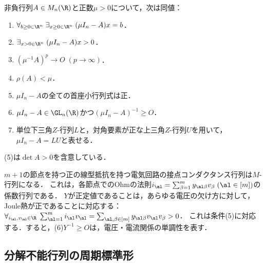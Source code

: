 \documentclass[uplatex, dvipdfmx]{jsreport}
\begin{document}
\begin{theorem}
    非負行列$A\in M_n(\R)$と正数$\mu>0$について，次は同値：
    \begin{enumerate}
        \item $\forall_{b\ge0\in\R^n}\;\exists_{x\ge0\in\R^n}\;(\mu I_n-A)x=b$．
        \item $\exists_{x>0\in\R^n}\;(\mu I_n-A)x>0$．
        \item $(\mu^{-1}A)^p\to O\;(p\to\infty)$．
        \item $\rho(A)<\mu$．
        \item $\mu I_n-A$の全ての首座小行列式は正．
        \item $\mu I_n-A\in\GL_n(\R)$かつ$(\mu I_n-A)^{-1}\ge O$．
        \item 単位下三角$Z$-行列$L$と，対角要素が正な上三角$Z$-行列$U$を用いて，$\mu I_n-A=LU$と表せる．
    \end{enumerate}
    (5)は$\det A>0$を含意している．
\end{theorem}
\begin{remarks}
    $m+1$の節点を持つ正の線型抵抗を持つ電気回路の接点コンダクタンス行列は$M$-行列になる．
    これは，各節点でのOhmの法則$i_\al=\sum_{\beta=1}^my_{\al\beta}v_\beta\;(\al\in[m])$の係数行列である．
    $Y$が正定値であることは，あらゆる電圧の欠け方に対して，Joule熱が正であることに対応する：$\forall_{i_\al,v_\al\in\R}\;\sum_{\al=1}^mi_\al v_\al=\sum_{\al,\beta\in[m]}y_{\al\beta}v_\al v_\beta>0$．
    これは条件(5)に対応する．すると，(6)$Y^{-1}\ge O$は，電圧・電流関係の単調性を表す．
\end{remarks}

\subsection{分解不能行列の周期標準形}
\end{document}
